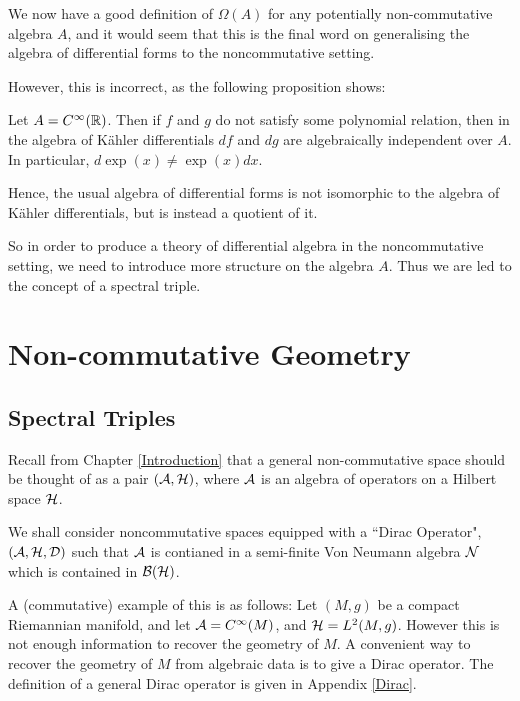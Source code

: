 We now have a good definition of $\Omega(A)$ for any potentially
non-commutative algebra $A$, and it would seem that this is the final
word on generalising the algebra of differential forms to the noncommutative setting.

However, this is incorrect, as the following proposition shows:
\begin{proposition}
    Let $A = C^\infty(\mathbb{R})$. Then if $f$ and $g$ do not satisfy some polynomial relation,
    then in the algebra of K\"ahler differentials $df$ and $dg$ are algebraically
    independent over $A$. In particular, $d\exp(x) \neq \exp(x)dx$. 
\end{proposition}

Hence, the usual algebra of differential forms is not isomorphic
to the algebra of K\"ahler differentials, but is instead a quotient of it. 

So in order to produce a theory of differential algebra in the noncommutative setting, we
need to introduce more structure on the algebra $A$. Thus we are
led to the concept of a spectral triple.




\section{Non-commutative Geometry}
\subsection{Spectral Triples}
Recall from Chapter \ref{Introduction} that a general non-commutative
space should be thought of as a pair $(\mathcal{A},\mathcal{H})$, where $\mathcal{A}$
is an algebra of operators on a Hilbert space $\mathcal{H}$. 


We shall consider noncommutative spaces equipped with a ``Dirac Operator", $(\mathcal{A},\mathcal{H},\mathcal{D})$
such that $\mathcal{A}$ is contianed in a semi-finite Von Neumann
algebra $\mathcal{N}$ which is contained in $\mathcal{B}(\mathcal{H})$.

A (commutative) example of this is as follows: Let $(M,g)$ be a compact Riemannian manifold,
and let $\mathcal{A} = C^\infty(M)$, and $\mathcal{H} = L^2(M,g)$. However
this is not enough information to recover the geometry of $M$. A convenient
way to recover the geometry of $M$ from algebraic data is to give a Dirac operator.
The definition of a general Dirac operator is given in Appendix \ref{Dirac}. 



